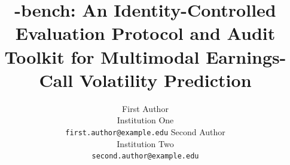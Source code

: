 \documentclass[11pt]{article}
\title{\ecvol-bench: An Identity-Controlled Evaluation Protocol and Audit\\
       Toolkit for Multimodal Earnings-Call Volatility Prediction}
\author{First Author \\
  Institution One \\
  \texttt{first.author@example.edu} \And
  Second Author \\
  Institution Two \\
  \texttt{second.author@example.edu}}
\begin{document}
\maketitle
\begin{abstract}

\end{abstract}















\end{document}

